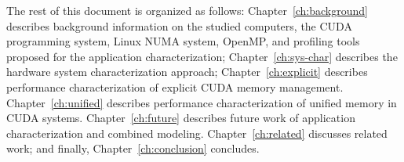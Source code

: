 The rest of this document is organized as follows:
Chapter~\ref{ch:background} describes background information on the studied computers, the CUDA programming system, Linux NUMA system, OpenMP, and profiling tools proposed for the application characterization;
Chapter~\ref{ch:sys-char} describes the hardware system characterization approach;
Chapter~\ref{ch:explicit} describes performance characterization of explicit CUDA memory management.
Chapter~\ref{ch:unified} describes performance characterization of unified memory in CUDA systems.
Chapter~\ref{ch:future} describes future work of application characterization and combined modeling.
Chapter~\ref{ch:related} discusses related work;
and finally, Chapter~\ref{ch:conclusion} concludes.